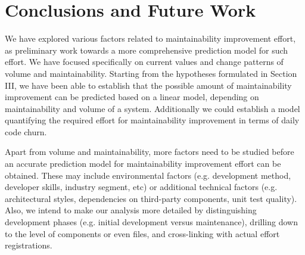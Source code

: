 \section{Conclusions and Future Work}
\label{sec:conclusion}
We have explored various factors related to maintainability improvement effort, as preliminary work towards a more comprehensive prediction model for such effort. We have focused specifically on current values and change patterns of volume and maintainability. Starting from the hypotheses formulated in Section III, we have been able to establish that the possible amount of maintainability improvement can be predicted based on a linear model, depending on maintainability and volume of a system. Additionally we could establish a model quantifying the required effort for maintainability improvement in terms of daily code churn.

Apart from volume and maintainability, more factors need to be studied before an accurate prediction model for maintainability improvement effort can be obtained. These may include environmental factors (e.g. development method, developer skills, industry segment, etc) or additional technical factors (e.g. architectural styles, dependencies on third-party components, unit test quality). Also, we intend to make our analysis more detailed by distinguishing development phases (e.g. initial development versus maintenance), drilling down to the level of components or even files, and cross-linking with actual effort registrations.

